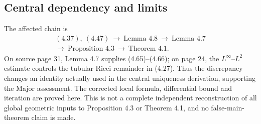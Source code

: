 \documentclass[10pt]{article}
\begin{document}
\subsection*{Central dependency and limits}
The affected chain is \[\begin{gathered}
 (4.37),\ (4.47)\ \longrightarrow\
 \text{Lemma 4.8}\ \longrightarrow\ \text{Lemma 4.7}\\
 \longrightarrow\ \text{Proposition 4.3}\ 
 \longrightarrow\ \text{Theorem 4.1}.
 \end{gathered}\] On source page 31, Lemma 4.7 supplies (4.65)–(4.66); on page 24, the \(L^\infty\)–\(L^2\) estimate controls the tubular Ricci remainder in (4.27). Thus the discrepancy changes an identity actually used in the central uniqueness derivation, supporting the Major assessment. The corrected local formula, differential bound and iteration are proved here. This is not a complete independent reconstruction of all global geometric inputs to Proposition 4.3 or Theorem 4.1, and no false-main-theorem claim is made.\par
\end{document}

